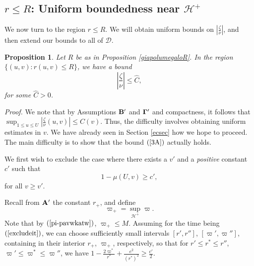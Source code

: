 \documentclass{article}
\newtheorem{proposition}{Proposition}[section]
\newcommand{\zn}{\frac{\zeta}{\nu}}
\begin{document}
\subsection{$r\le R$: Uniform boundedness near $\mathcal{H}^+$}
\label{UB}
We now turn to the region $r \le R$.
We will obtain uniform bounds on $\left|\zn\right|$, and then
extend our bounds to all of $\mathcal{D}$. 

\begin{proposition} 
\label{ZBD}
Let $R$ be as in Proposition \ref{giapolumegaloR}.
In the region $\{(u,v):r(u,v)\le R\}$, we have a bound
\begin{equation}
\label{2A}
\left|\zn\right|\le \hat{C},
\end{equation}
for some $\hat{C}>0$.
\end{proposition}

\noindent\emph{Proof.}
We note that by Assumptions ${\bf B}'$ and ${\bf \Gamma}'$ and compactness, 
it follows that $\sup_{1\le u\le U}\left|\zn(u,v)\right|\le C(v)$.
Thus, the difficulty involves obtaining uniform estimates in $v$.
We have already seen in Section \ref{ecsec} how we hope to proceed. The main difficulty
is to show that the bound $(\ref{3A})$ actually holds.

We first wish to exclude the case where there exists a $v'$ and
a \emph{positive} constant $c'$ such that
\begin{equation}
\label{excludeit}
1-\mu(U,v)\ge c',
\end{equation}
for all $v\ge v'$.

Recall from ${\bf A}'$ the constant $r_+$, and
define
\[
\varpi_+=\sup_{\mathcal{H}^+}\varpi.
\]
Note that by $(\ref{pi-pavwkatw})$, $\varpi_+\le M$. 
Assuming for the time being $(\ref{excludeit})$, 
we can choose 
sufficiently small intervals $[r',r'']$, $[\varpi',\varpi'']$,
containing in their interior $r_+$, $\varpi_+$, respectively,
so that for $r'\le r^*\le r''$, $\varpi'\le \varpi^*\le \varpi''$,
we have $1-\frac{2\varpi^*}{r^*}+\frac{e^2}{(r^*)^2}\ge \frac {c'}2$.
\end{document}
